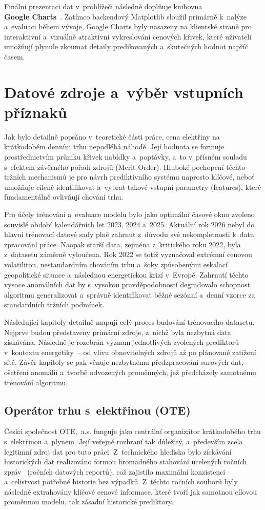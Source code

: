 \documentclass[a4paper]{article}
\begin{document}
Finální prezentaci dat v~prohlížeči následně doplňuje knihovna \\ \textbf{Google Charts}~\cite{google-charts}. Zatímco backendový Matplotlib sloužil primárně k~nalýze a~evaluaci během vývoje, Google Charts byly nasazeny na klientské straně pro interaktivní a~vizuálně atraktivní vykreslování cenových křivek, které uživateli umožňují plynule zkoumat detaily predikovaných a~skutečných hodnot napříč časem.

\newpage
\section{Datové zdroje a~výběr vstupních příznaků}
Jak bylo detailně popsáno v~teoretické části práce, cena elektřiny na krátkodobém denním trhu nepodléhá náhodě. Její hodnota se formuje prostřednictvím průniku křivek nabídky a~poptávky, a~to v~přísném souladu s~efektem závěrného pořadí zdrojů (Merit Order). Hluboké pochopení těchto tržních mechanismů je pro návrh prediktivního systému naprosto klíčové, neboť umožňuje cíleně identifikovat a~vybrat takové vstupní parametry (features), které fundamentálně ovlivňují chování trhu.

Pro účely trénování a~evaluace modelu bylo jako optimální časové okno zvoleno souvislé období kalendářních let 2023, 2024 a~2025. Aktuální rok 2026 nebyl do hlavní trénovací datové sady plně zahrnut z~důvodu své nekompletnosti k~datu zpracování práce. Naopak starší data, zejména z~kritického roku 2022, byla z~datasetu záměrně vyloučena. Rok 2022 se totiž vyznačoval extrémní cenovou volatilitou, nestandardním chováním trhu a~šoky způsobenými eskalací geopolitické situace a~následnou energetickou krizí v~Evropě. Zahrnutí těchto vysoce anomálních dat by s~vysokou pravděpodobností degradovalo schopnost algoritmu generalizovat a~správně identifikovat běžné sezónní a~denní vzorce za standardních tržních podmínek.

Následující kapitoly detailně mapují celý proces budování trénovacího datasetu. Nejprve budou představeny primární zdroje, z~nichž byla nezbytná data získávána. Následně je rozebrán význam jednotlivých zvolených prediktorů v~kontextu energetiky~-- od vlivu obnovitelných zdrojů až po plánované zatížení sítě. Závěr kapitoly se pak věnuje nezbytnému předzpracování surových dat, ošetření anomálií a~tvorbě odvozených proměnných, jež předcházely samotnému trénování algoritmu.

\subsection{Operátor trhu s~elektřinou (OTE)}
Česká společnost OTE,~a.s. funguje jako centrální organizátor krátkodobého trhu s~elektřinou a~plynem. Její veřejné rozhraní tak důležitý, a~především zcela legitimní zdroj dat pro tuto práci. Z~technického hlediska bylo získávání historických dat realizováno formou hromadného stahování ucelených ročních zpráv~\cite{ote-rocni-zprava} (ročních datových reportů), což zajistilo maximální konzistenci a~celistvost potřebné historie bez výpadků. Z~těchto ročních souborů byly následně extrahovány klíčové cenové informace, které tvoří jak samotnou cílovou proměnnou modelu, tak zásadní historické prediktory.
\end{document}
